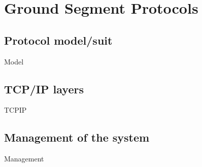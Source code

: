 \chapter{Ground Segment Protocols}


\section{Protocol model/suit}
{Model}

\section{TCP/IP layers}
{TCPIP}

\section{Management of the system}
{Management}

